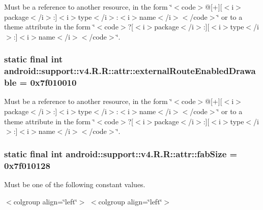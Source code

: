 Must be a reference to another resource, in the form \char`\"{}$<$code$>$@\mbox{[}+\mbox{]}\mbox{[}$<$i$>$package$<$/i$>$:\mbox{]}$<$i$>$type$<$/i$>$:$<$i$>$name$<$/i$>$$<$/code$>$\char`\"{} or to a theme attribute in the form \char`\"{}$<$code$>$?\mbox{[}$<$i$>$package$<$/i$>$:\mbox{]}\mbox{[}$<$i$>$type$<$/i$>$:\mbox{]}$<$i$>$name$<$/i$>$$<$/code$>$\char`\"{}. \hypertarget{classandroid_1_1support_1_1v4_1_1_r_1_1attr_7dfbd3facdcafd6ab6b4553cd425962e}{
\subsubsection[{externalRouteEnabledDrawable}]{\setlength{\rightskip}{0pt plus 5cm}static final int android::support::v4.R.R::attr::externalRouteEnabledDrawable = 0x7f010010}}
\label{classandroid_1_1support_1_1v4_1_1_r_1_1attr_7dfbd3facdcafd6ab6b4553cd425962e}


Must be a reference to another resource, in the form \char`\"{}$<$code$>$@\mbox{[}+\mbox{]}\mbox{[}$<$i$>$package$<$/i$>$:\mbox{]}$<$i$>$type$<$/i$>$:$<$i$>$name$<$/i$>$$<$/code$>$\char`\"{} or to a theme attribute in the form \char`\"{}$<$code$>$?\mbox{[}$<$i$>$package$<$/i$>$:\mbox{]}\mbox{[}$<$i$>$type$<$/i$>$:\mbox{]}$<$i$>$name$<$/i$>$$<$/code$>$\char`\"{}. \hypertarget{classandroid_1_1support_1_1v4_1_1_r_1_1attr_0443d1b2a5dd1c72d6f44120ad17435f}{
\subsubsection[{fabSize}]{\setlength{\rightskip}{0pt plus 5cm}static final int android::support::v4.R.R::attr::fabSize = 0x7f010128}}
\label{classandroid_1_1support_1_1v4_1_1_r_1_1attr_0443d1b2a5dd1c72d6f44120ad17435f}


Must be one of the following constant values. \begin{TabularC}{0}
\hline
\end{TabularC}
$<$colgroup align=\char`\"{}left\char`\"{}$>$ $<$colgroup align=\char`\"{}left\char`\"{}$>$ 


